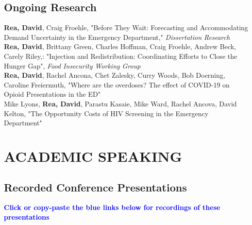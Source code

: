 \documentclass[12pt, letter]{moderncv}
\begin{document}
\subsection{Ongoing Research}
\textbf{Rea, David}, Craig Froehle, "Before They Wait: Forecasting and Accommodating Demand Uncertainty in the Emergency Department," \textit{Dissertation Research}
\medskip \\
\textbf{Rea, David}, Brittany Green, Charles Hoffman, Craig Froehle, Andrew Beck, Carely Riley,: "Injection and Redistribution: Coordinating Efforts to Close the Hunger Gap", \textit{Food Insecurity Working Group}
\medskip \\
\textbf{Rea, David}, Rachel Ancona, Chet Zalesky, Curry Woods, Bob Doerning, Caroline Freiermuth, "Where are the overdoses? The effect of COVID-19 on Opioid Presentations in the ED"
\medskip \\
 Mike Lyons, \textbf{Rea, David}, Parastu Kasaie, Mike Ward, Rachel Ancova, David Kelton, "The Opportunity Costs of HIV Screening in the Emergency Department" 

\section{ACADEMIC SPEAKING}

\smallskip
\subsection{Recorded Conference Presentations}
\smallskip
\textbf{\textcolor{blue}{Click or copy-paste the blue links below for recordings of these presentations}}\\
\medskip\medskip
\newline
{}
\medskip
{}
\medskip
{}
\smallskip
\end{document}
